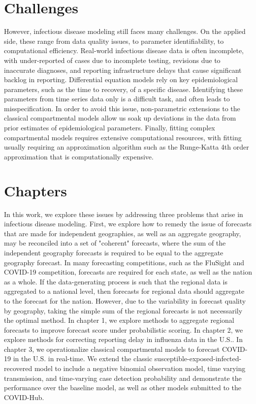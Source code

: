 \documentclass{umassthesis}          %
\begin{document}
\section{Challenges}
   However, infectious disease modeling still faces many challenges. On the applied side, these range from data quality issues, to parameter identifiability, to computational efficiency. Real-world infectious disease data is often incomplete, with under-reported of cases due to incomplete testing, revisions due to inaccurate diagnoses, and reporting infrastructure delays that cause significant backlog in reporting.  Differential equation models rely on key epidemiological parameters, such as the time to recovery, of a specific disease. Identifying these parameters from time series data only is a difficult task, and often leads to misspecification. In order to avoid this issue, non-parametric extensions to the classical compartmental models allow us soak up deviations in the data from prior estimates of epidemiological parameters. Finally, fitting complex compartmental models requires extensive computational resources, with fitting usually requiring an approximation algorithm such as the Runge-Katta 4th order approximation that is computationally expensive. 
   
   
 \section{Chapters}  
           In this work, we explore these issues by addressing three problems that arise in infectious disease modeling. First, we explore how to remedy the issue of forecasts that are made for independent geographies, as well as an aggregate geography, may be reconciled into a set of "coherent" forecasts, where the sum of the independent geography forecasts is required to be equal to the aggregate geography forecast. In many forecasting competitions, such as the FluSight and COVID-19 competition, forecasts are required for each state, as well as the nation as a whole. If the data-generating process is such that the regional data is aggregated to a national level, then forecasts for regional data should aggregate to the forecast for the nation. However, due to the variability in forecast quality by geography, taking the simple sum of the regional forecasts is not necessarily the optimal method. In chapter 1, we explore methods to aggregate regional forecasts to improve forecast score under probabilistic scoring. In chapter 2, we explore methods for correcting reporting delay in influenza data in the U.S.. In chapter 3, we operationalize classical compartmental models to forecast COVID-19 in the U.S. in real-time. We extend the classic susceptible-exposed-infected-recovered model to include a negative binomial observation model, time varying transmission, and time-varying case detection probability and demonstrate the performance over the baseline model, as well as other models submitted to the COVID-Hub.
\end{document}
